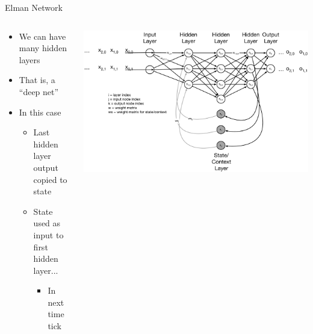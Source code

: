 \documentclass[aspectratio=169]{beamer}
\begin{document}
\begin{frame}{Elman Network}

\begin{columns}
\begin{column}{0.4\textwidth}
\begin{itemize}
	\item We can have many hidden layers
	\item That is, a ``deep net''
	\item In this case
	\begin{itemize}
		\item Last hidden layer output copied to state
		\item State used as input to first hidden layer...
	\begin{itemize}
		\item In next time tick
	\end{itemize}
	\end{itemize}
\end{itemize}
\end{column}
\begin{column}{0.6\textwidth}
\includegraphics[width=1\textwidth]{lectRNN/ElmanDeep.pdf}
\end{column}
\end{columns}
\end{frame}
\end{document}
